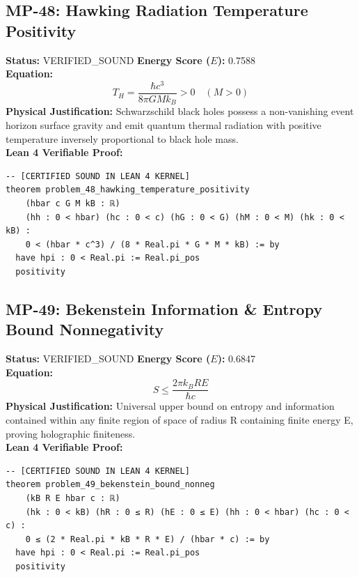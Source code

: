 \documentclass[11pt, a4paper]{article}
\begin{document}
\subsection{MP-48: Hawking Radiation Temperature Positivity}
\textbf{Status:} VERIFIED\_SOUND \hfill \textbf{Energy Score ($E$):} 0.7588\\
\textbf{Equation:}
\begin{equation*}
T_H = \frac{\hbar c^3}{8\pi G M k_B} > 0 \quad (M > 0)
\end{equation*}
\textbf{Physical Justification:} Schwarzschild black holes possess a non-vanishing event horizon surface gravity and emit quantum thermal radiation with positive temperature inversely proportional to black hole mass.\\
\textbf{Lean 4 Verifiable Proof:}
\begin{verbatim}
-- [CERTIFIED SOUND IN LEAN 4 KERNEL]
theorem problem_48_hawking_temperature_positivity
    (hbar c G M kB : ℝ)
    (hh : 0 < hbar) (hc : 0 < c) (hG : 0 < G) (hM : 0 < M) (hk : 0 < kB) :
    0 < (hbar * c^3) / (8 * Real.pi * G * M * kB) := by
  have hpi : 0 < Real.pi := Real.pi_pos
  positivity

\end{verbatim}

\subsection{MP-49: Bekenstein Information \& Entropy Bound Nonnegativity}
\textbf{Status:} VERIFIED\_SOUND \hfill \textbf{Energy Score ($E$):} 0.6847\\
\textbf{Equation:}
\begin{equation*}
S \le \frac{2\pi k_B R E}{\hbar c}
\end{equation*}
\textbf{Physical Justification:} Universal upper bound on entropy and information contained within any finite region of space of radius R containing finite energy E, proving holographic finiteness.\\
\textbf{Lean 4 Verifiable Proof:}
\begin{verbatim}
-- [CERTIFIED SOUND IN LEAN 4 KERNEL]
theorem problem_49_bekenstein_bound_nonneg
    (kB R E hbar c : ℝ)
    (hk : 0 < kB) (hR : 0 ≤ R) (hE : 0 ≤ E) (hh : 0 < hbar) (hc : 0 < c) :
    0 ≤ (2 * Real.pi * kB * R * E) / (hbar * c) := by
  have hpi : 0 < Real.pi := Real.pi_pos
  positivity

\end{verbatim}
\end{document}
